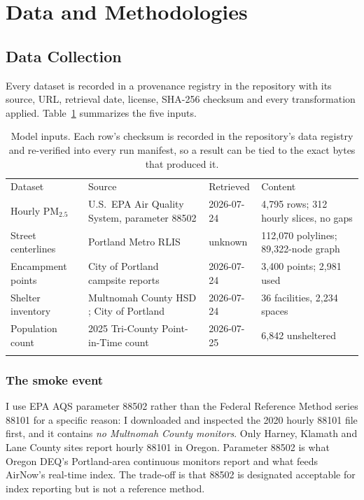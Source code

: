 \documentclass[graybox]{svmult}
\begin{document}
\section{Data and Methodologies}
\label{sec:methods}

\subsection{Data Collection}
\label{subsec:data}

Every dataset is recorded in a provenance registry in the repository with its
source, URL, retrieval date, license, SHA-256 checksum and every transformation
applied. Table~\ref{tab:data} summarizes the five inputs.

\begin{table}
\caption{Model inputs. Each row's checksum is recorded in the repository's data
registry and re-verified into every run manifest, so a result can be tied to the
exact bytes that produced it.}
\label{tab:data}
\begin{tabular}{p{2.5cm}p{3.3cm}p{1.5cm}p{3.1cm}}
\hline\noalign{\smallskip}
Dataset & Source & Retrieved & Content \\
\noalign{\smallskip}\svhline\noalign{\smallskip}
Hourly PM$_{2.5}$ & U.S.\ EPA Air Quality System, parameter 88502
  \cite{epa2020aqs} & 2026-07-24 & 4,795 rows; 312 hourly slices, no gaps \\
Street centerlines & Portland Metro RLIS & unknown & 112,070 polylines;
  89,322-node graph \\
Encampment points & City of Portland campsite reports \cite{portlandirp}
  & 2026-07-24 & 3,400 points; 2,981 used \\
Shelter inventory & Multnomah County HSD \cite{multcoshelters}; City of
  Portland \cite{portlandsrv} & 2026-07-24 & 36 facilities, 2,234 spaces \\
Population count & 2025 Tri-County Point-in-Time count \cite{pitc2025}
  & 2026-07-25 & 6,842 unsheltered \\
\noalign{\smallskip}\hline\noalign{\smallskip}
\end{tabular}
\end{table}

\subsubsection{The smoke event}

I use EPA AQS parameter 88502 rather than the Federal Reference Method series
88101 for a specific reason: I downloaded and inspected the 2020 hourly 88101
file first, and it contains \emph{no Multnomah County monitors}. Only Harney,
Klamath and Lane County sites report hourly 88101 in Oregon. Parameter 88502 is
what Oregon DEQ's Portland-area continuous monitors report and what feeds
AirNow's real-time index. The trade-off is that 88502 is designated acceptable
for index reporting but is not a reference method.
\end{document}
